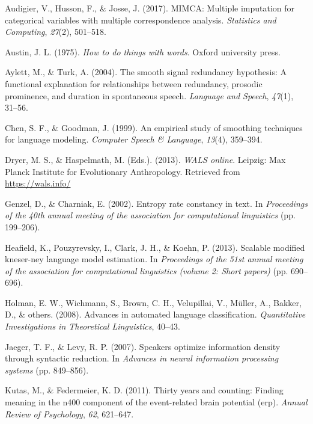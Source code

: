 \documentclass[10pt, letterpaper]{article}
\begin{document}
\leavevmode\hypertarget{ref-audigier2017}{}%
Audigier, V., Husson, F., \& Josse, J. (2017). MIMCA: Multiple
imputation for categorical variables with multiple correspondence
analysis. \emph{Statistics and Computing}, \emph{27}(2), 501--518.

\leavevmode\hypertarget{ref-austin1975}{}%
Austin, J. L. (1975). \emph{How to do things with words}. Oxford
university press.

\leavevmode\hypertarget{ref-aylett2004}{}%
Aylett, M., \& Turk, A. (2004). The smooth signal redundancy hypothesis:
A functional explanation for relationships between redundancy, prosodic
prominence, and duration in spontaneous speech. \emph{Language and
Speech}, \emph{47}(1), 31--56.

\leavevmode\hypertarget{ref-chen1999empirical}{}%
Chen, S. F., \& Goodman, J. (1999). An empirical study of smoothing
techniques for language modeling. \emph{Computer Speech \& Language},
\emph{13}(4), 359--394.

\leavevmode\hypertarget{ref-wals}{}%
Dryer, M. S., \& Haspelmath, M. (Eds.). (2013). \emph{WALS online}.
Leipzig: Max Planck Institute for Evolutionary Anthropology. Retrieved
from \url{https://wals.info/}

\leavevmode\hypertarget{ref-genzel2002}{}%
Genzel, D., \& Charniak, E. (2002). Entropy rate constancy in text. In
\emph{Proceedings of the 40th annual meeting of the association for
computational linguistics} (pp. 199--206).

\leavevmode\hypertarget{ref-heafield2013scalable}{}%
Heafield, K., Pouzyrevsky, I., Clark, J. H., \& Koehn, P. (2013).
Scalable modified kneser-ney language model estimation. In
\emph{Proceedings of the 51st annual meeting of the association for
computational linguistics (volume 2: Short papers)} (pp. 690--696).

\leavevmode\hypertarget{ref-holman2008}{}%
Holman, E. W., Wichmann, S., Brown, C. H., Velupillai, V., Müller, A.,
Bakker, D., \& others. (2008). Advances in automated language
classification. \emph{Quantitative Investigations in Theoretical
Linguistics}, 40--43.

\leavevmode\hypertarget{ref-jaeger2007}{}%
Jaeger, T. F., \& Levy, R. P. (2007). Speakers optimize information
density through syntactic reduction. In \emph{Advances in neural
information processing systems} (pp. 849--856).

\leavevmode\hypertarget{ref-kutas2011}{}%
Kutas, M., \& Federmeier, K. D. (2011). Thirty years and counting:
Finding meaning in the n400 component of the event-related brain
potential (erp). \emph{Annual Review of Psychology}, \emph{62},
621--647.
\end{document}
